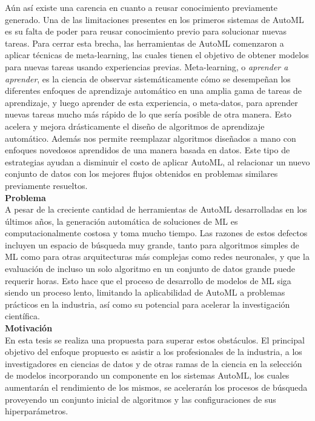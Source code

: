 Aún así existe una carencia en cuanto a reusar conocimiento previamente
generado. Una de las limitaciones presentes en los primeros sistemas de AutoML
es su falta de poder para reusar conocimiento previo para solucionar nuevas
tareas. Para cerrar esta brecha, las herramientas de AutoML comenzaron a
aplicar técnicas de meta-learning, las cuales tienen el objetivo de obtener
modelos para nuevas tareas usando experiencias previas. Meta-learning, o
\emph{aprender a aprender}, es la ciencia de observar sistemáticamente cómo se
desempeñan los diferentes enfoques de aprendizaje automático en una amplia
gama de tareas de aprendizaje, y luego aprender de esta experiencia, o
meta-datos, para aprender nuevas tareas mucho más rápido de lo que sería
posible de otra manera. Esto acelera y mejora drásticamente el diseño
de algoritmos de aprendizaje automático. Además nos permite reemplazar
algoritmos diseñados a mano con enfoques novedosos aprendidos de una manera
basada en datos. Este tipo de estrategias ayudan a disminuir el costo de
aplicar AutoML, al relacionar un nuevo conjunto de datos con los mejores flujos
obtenidos en problemas similares previamente resueltos.\\

\textbf{\Large Problema}\\

A pesar de la creciente cantidad de herramientas de AutoML desarrolladas en los
últimos años, la generación automática de soluciones de ML es
computacionalmente costosa y toma mucho tiempo. Las razones de estos defectos
incluyen un espacio de búsqueda muy grande, tanto para algoritmos simples de ML
como para otras arquitecturas más complejas como redes neuronales, y que la
evaluación de incluso un solo algoritmo en un conjunto de datos grande puede requerir
horas. Esto hace que el proceso de desarrollo de modelos de ML siga siendo un
proceso lento, limitando la aplicabilidad de AutoML a problemas prácticos en la
industria, así como su potencial para acelerar la investigación científica.\\

\textbf{\Large Motivación}\\

En esta tesis se realiza una propuesta para superar estos obstáculos. El
principal objetivo del enfoque propuesto es asistir a los profesionales de la
industria, a los investigadores en ciencias de datos y de otras ramas de la
ciencia en la selección de modelos incorporando un componente en los
sistemas AutoML, los cuales aumentarán el rendimiento de los mismos, se
acelerarán los procesos de búsqueda proveyendo un conjunto inicial de
algoritmos y las configuraciones de sus hiperparámetros.

